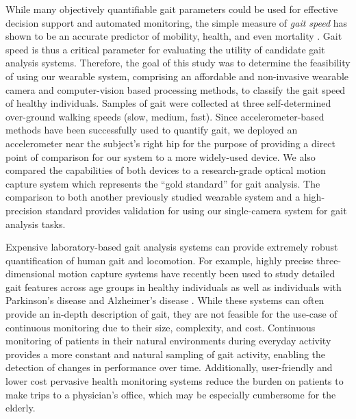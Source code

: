 \documentclass[12pt]{report}
\begin{document}
While many objectively quantifiable gait parameters could be used for effective decision support and automated monitoring, the simple measure of \textit{gait speed} has shown to be an accurate predictor of mobility, health, and even mortality \cite{Afilalo2010GaitSurgery, Viccaro2011GaitForce, Fitzpatrick2007AssociationsPersons}. Gait speed is thus a critical parameter for evaluating the utility of candidate gait analysis systems. Therefore, the goal of this study was to determine the feasibility of using our wearable system, comprising an affordable and non-invasive wearable camera and computer-vision based processing methods, to classify the gait speed of healthy individuals. Samples of gait were collected at three self-determined over-ground walking speeds (slow, medium, fast). Since accelerometer-based methods have been successfully used to quantify gait, we deployed an accelerometer near the subject's right hip for the purpose of providing a direct point of comparison for our system to a more widely-used device. We also compared the capabilities of both devices to a research-grade optical motion capture system which represents the ``gold standard'' for gait analysis. The comparison to both another previously studied wearable system and a high-precision standard provides validation for using our single-camera system for gait analysis tasks.

Expensive laboratory-based gait analysis systems can provide extremely robust quantification of human gait and locomotion. For example, highly precise three-dimensional motion capture systems have recently been used to study detailed gait features across age groups in healthy individuals \cite{Chien2015TheIndividuals} as well as individuals with Parkinson's disease \cite{Corona2016QuantitativeDisease} and Alzheimer's disease \cite{Rucco2017Spatio-temporalCapture}. While these systems can often provide an in-depth description of gait, they are not feasible for the use-case of continuous monitoring due to their size, complexity, and cost. Continuous monitoring of patients in their natural environments during everyday activity provides a more constant and natural sampling of gait activity, enabling the detection of changes in performance over time. Additionally, user-friendly and lower cost pervasive health monitoring systems reduce the burden on patients to make trips to a physician's office, which may be especially cumbersome for the elderly.
\end{document}
